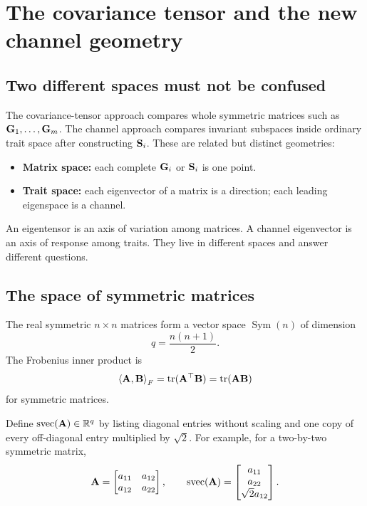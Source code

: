 \chapter{The covariance tensor and the new channel geometry}

\section{Two different spaces must not be confused}

The covariance-tensor approach compares whole symmetric matrices such as \(\mathbf{G}_1,\ldots,\mathbf{G}_m\). The channel approach compares invariant subspaces inside ordinary trait space after constructing \(\mathbf{S}_i\). These are related but distinct geometries:

\begin{itemize}[leftmargin=1.6em]
\item \textbf{Matrix space:} each complete \(\mathbf{G}_i\) or \(\mathbf{S}_i\) is one point.
\item \textbf{Trait space:} each eigenvector of a matrix is a direction; each leading eigenspace is a channel.
\end{itemize}

\begin{cautionbox}
An eigentensor is an axis of variation among matrices. A channel eigenvector is an axis of response among traits. They live in different spaces and answer different questions.
\end{cautionbox}

\section{The space of symmetric matrices}

The real symmetric \(n\times n\) matrices form a vector space \(\operatorname{Sym}(n)\) of dimension
\begin{equation}
q=\frac{n(n+1)}2.
\end{equation}
The Frobenius inner product is
\begin{equation}
\left\langle \mathbf A,\mathbf B\right\rangle_F
=\operatorname{tr}(\mathbf A^\top\mathbf B)
=\operatorname{tr}(\mathbf A\mathbf B)
\end{equation}
for symmetric matrices.

Define \(\operatorname{svec}(\mathbf A)\in\mathbb R^q\) by listing diagonal entries without scaling and one copy of every off-diagonal entry multiplied by \(\sqrt2\). For example, for a two-by-two symmetric matrix,
\begin{equation}
\mathbf A=
\begin{bmatrix}
a_{11}&a_{12}\\a_{12}&a_{22}
\end{bmatrix},
\qquad
\operatorname{svec}(\mathbf A)=
\begin{bmatrix}
a_{11}\\a_{22}\\\sqrt2a_{12}
\end{bmatrix}.
\end{equation}

